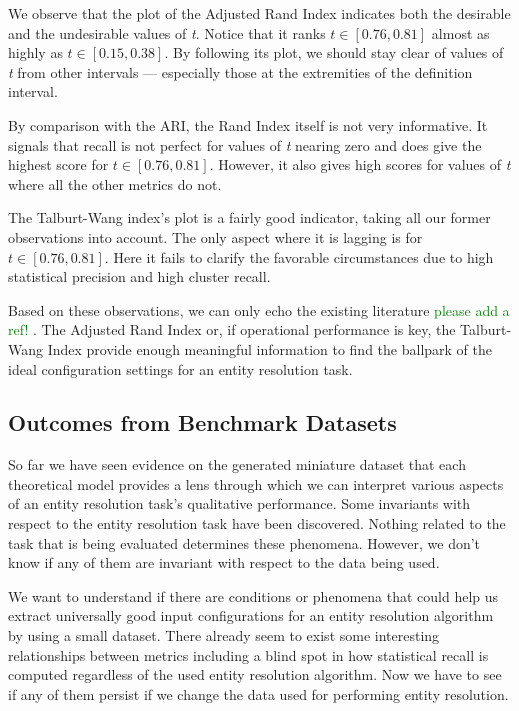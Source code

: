 We observe that the plot of the Adjusted Rand Index indicates both the desirable
and the undesirable values of \textit{t}.
Notice that it ranks $t\in\left[0.76,0.81\right]$ almost as highly as
$t\in\left[0.15,0.38\right]$.
By following its plot, we should stay clear of values of \textit{t} from other
intervals --- especially those at the extremities of the definition interval.

By comparison with the ARI, the Rand Index itself is not very informative.
It signals that recall is not perfect for values of \textit{t} nearing zero and
does give the highest score for $t\in\left[0.76,0.81\right]$.
However, it also gives high scores for values of \textit{t} where all the other
metrics do not.

The Talburt-Wang index's plot is a fairly good indicator, taking all our former
observations into account.
The only aspect where it is lagging is for $t\in\left[0.76,0.81\right]$.
Here it fails to clarify the favorable circumstances due to high statistical
precision and high cluster recall.

Based on these observations, we can only echo the existing literature 
\textcolor{green}{please add a ref!}
.
The Adjusted Rand Index or, if operational performance is key, the Talburt-Wang
Index provide enough meaningful information to find the ballpark of the ideal
configuration settings for an entity resolution task.

\subsection{Outcomes from Benchmark Datasets}\label{subsec:experiment-benchmark}

So far we have seen evidence on the generated miniature dataset that each
theoretical model provides a lens through which we can interpret various aspects
of an entity resolution task's qualitative performance.
Some invariants with respect to the entity resolution task have been discovered.
Nothing related to the task that is being evaluated determines these phenomena.
However, we don't know if any of them are invariant with respect to the data
being used.

We want to understand if there are conditions or phenomena that could help us
extract universally good input configurations for an entity resolution algorithm
by using a small dataset.
There already seem to exist some interesting relationships between metrics
including a blind spot in how statistical recall is computed regardless of the
used entity resolution algorithm.
Now we have to see if any of them persist if we change the data used for
performing entity resolution.

